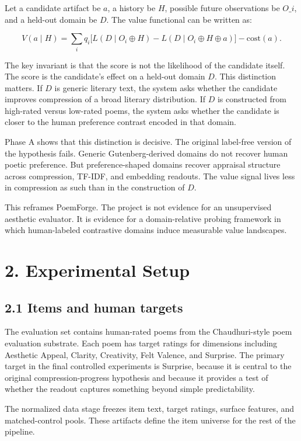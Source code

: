 \documentclass[11pt]{article}
\begin{document}
Let a candidate artifact be \(a\), a history be \(H\), possible future observations be \(O\_i\), and a held-out domain be \(D\). The value functional can be written as:

\[
V(a \mid H)
=
\sum_i q_i
\Big[
L(D \mid O_i \oplus H)
-
L(D \mid O_i \oplus H \oplus a)
\Big]
-
\mathrm{cost}(a).
\]

The key invariant is that the score is not the likelihood of the candidate itself. The score is the candidate’s effect on a held-out domain \(D\). This distinction matters. If \(D\) is generic literary text, the system asks whether the candidate improves compression of a broad literary distribution. If \(D\) is constructed from high-rated versus low-rated poems, the system asks whether the candidate is closer to the human preference contrast encoded in that domain.

Phase A shows that this distinction is decisive. The original label-free version of the hypothesis fails. Generic Gutenberg-derived domains do not recover human poetic preference. But preference-shaped domains recover appraisal structure across compression, TF-IDF, and embedding readouts. The value signal lives less in compression as such than in the construction of \(D\).

This reframes PoemForge. The project is not evidence for an unsupervised aesthetic evaluator. It is evidence for a domain-relative probing framework in which human-labeled contrastive domains induce measurable value landscapes.

\section{2. Experimental Setup}

\subsection{2.1 Items and human targets}

The evaluation set contains human-rated poems from the Chaudhuri-style poem evaluation substrate. Each poem has target ratings for dimensions including Aesthetic Appeal, Clarity, Creativity, Felt Valence, and Surprise. The primary target in the final controlled experiments is Surprise, because it is central to the original compression-progress hypothesis and because it provides a test of whether the readout captures something beyond simple predictability.

The normalized data stage freezes item text, target ratings, surface features, and matched-control pools. These artifacts define the item universe for the rest of the pipeline.
\end{document}
